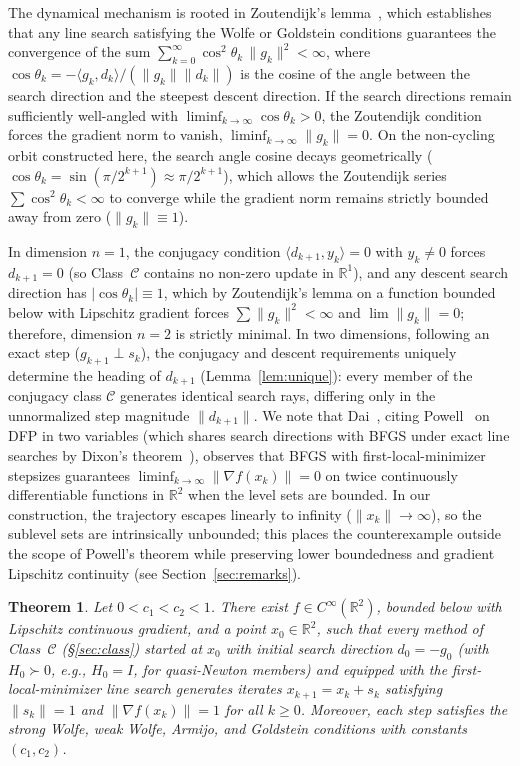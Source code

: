 \documentclass[11pt]{article}
\newtheorem{theorem}{Theorem}
\newcommand{\R}{\mathbb{R}}
\newcommand{\ip}[2]{\langle #1,#2\rangle}
\begin{document}
The dynamical mechanism is rooted in Zoutendijk's lemma~\cite{wolfe1969,zoutendijk1970,nocedalwright2006}, which establishes that any line search satisfying the Wolfe or Goldstein conditions guarantees the convergence of the sum $\sum_{k=0}^\infty \cos^2\theta_k\,\|g_k\|^2 < \infty$, where $\cos\theta_k = -\ip{g_k}{d_k}/(\|g_k\|\|d_k\|)$ is the cosine of the angle between the search direction and the steepest descent direction.
If the search directions remain sufficiently well-angled with $\liminf_{k\to\infty} \cos\theta_k > 0$, the Zoutendijk condition forces the gradient norm to vanish, $\liminf_{k\to\infty} \|g_k\| = 0$.
On the non-cycling orbit constructed here, the search angle cosine decays geometrically ($\cos\theta_k = \sin(\pi/2^{k+1}) \approx \pi/2^{k+1}$), which allows the Zoutendijk series $\sum \cos^2\theta_k < \infty$ to converge while the gradient norm remains strictly bounded away from zero ($\|g_k\| \equiv 1$).

In dimension $n = 1$, the conjugacy condition $\ip{d_{k+1}}{y_k}=0$ with $y_k \ne 0$ forces $d_{k+1}=0$ (so Class~$\mathcal C$ contains no non-zero update in $\R^1$), and any descent search direction has $|\cos\theta_k| \equiv 1$, which by Zoutendijk's lemma on a function bounded below with Lipschitz gradient forces $\sum \|g_k\|^2 < \infty$ and $\lim \|g_k\| = 0$; therefore, dimension $n = 2$ is strictly minimal.
In two dimensions, following an exact step ($g_{k+1} \perp s_k$), the conjugacy and descent requirements uniquely determine the heading of $d_{k+1}$ (Lemma~\ref{lem:unique}): every member of the conjugacy class $\mathcal{C}$ generates identical search rays, differing only in the unnormalized step magnitude $\|d_{k+1}\|$.
We note that Dai~\cite{dai2013}, citing Powell~\cite{powell2000} on DFP in two variables (which shares search directions with BFGS under exact line searches by Dixon's theorem~\cite{dixon1972}), observes that BFGS with first-local-minimizer stepsizes guarantees $\liminf_{k\to\infty} \|\nabla f(x_k)\| = 0$ on twice continuously differentiable functions in $\R^2$ when the level sets are bounded.
In our construction, the trajectory escapes linearly to infinity ($\|x_k\| \to \infty$), so the sublevel sets are intrinsically unbounded; this places the counterexample outside the scope of Powell's theorem while preserving lower boundedness and gradient Lipschitz continuity (see Section~\ref{sec:remarks}).

\begin{theorem}
\label{thm:main}
Let $0<c_1<c_2<1$. There exist $f\in C^\infty(\R^2)$, bounded below with
Lipschitz continuous gradient, and a point $x_0\in\R^2$, such that
every method of Class~$\mathcal C$ (\S\ref{sec:class}) started at $x_0$
with initial search direction $d_0=-g_0$ (with $H_0 \succ 0$, e.g., $H_0 = I$, for quasi-Newton members) and equipped with the first-local-minimizer
line search generates iterates $x_{k+1}=x_k+s_k$ satisfying
$\|s_k\|=1$ and $\|\nabla f(x_k)\|=1$ for all $k\ge0$.
Moreover, each step satisfies the strong Wolfe, weak Wolfe, Armijo, and
Goldstein conditions with constants $(c_1,c_2)$.
\end{theorem}
\end{document}
